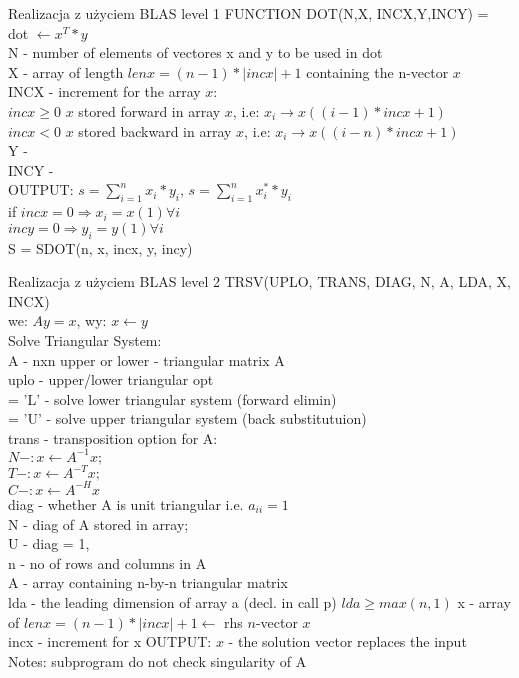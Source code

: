 	\begin{frame}{Realizacja z użyciem BLAS level 1}
		FUNCTION \textunderscore DOT(N,X, INCX,Y,INCY) = dot $ \leftarrow x^T * y $ \\ %
		N - number of elements of vectores x and y to be used in dot \\
		X - array of length $lenx = (n - 1) * |inc x| + 1$ containing the n-vector $x$ \\
		INCX - increment for the array $x$: \\
		$incx \geq 0 $ $x$ stored forward in array $x$, i.e: $x_i \rightarrow x((i - 1) * incx + 1)$ \\
		$incx < 0$ $x$ stored backward in array $x$, i.e: $x_i \rightarrow x((i - n) * incx + 1)$ \\
		Y - \\
		INCY - \\
		OUTPUT: $s = \sum_{i=1}^n x_i * y_i$, $s = \sum_{i=1}^n x_i^{*} * y_i$ \\
		if $incx = 0 \Rightarrow x_i = x(1) \forall i$ \\
		$incy = 0 \Rightarrow y_i = y(1) \forall i$ \\
		S = SDOT(n, x, incx, y, incy)
	\end{frame}
	\begin{frame}[allowframebreaks]{Realizacja z użyciem BLAS level 2}
	\textunderscore TRSV(UPLO, TRANS, DIAG, N, A, LDA, X, INCX) \\ %
	we: $ Ay = x $, wy: $x \leftarrow y$ \\ %
	Solve Triangular System: \\ 
	A - nxn upper or lower - triangular matrix A \\ %
	uplo - upper/lower triangular opt \\
	= 'L' - solve lower triangular system (forward elimin) \\
	= 'U' - solve upper triangular system (back substitutuion) \\
	trans - transposition option for A: \\
	$N - : x \leftarrow A^{-1} x;$ \\
	$T - : x \leftarrow A^{-T} x;$ \\
	$C - : x \leftarrow A^{-H} x$ \\
	diag - whether A is unit triangular i.e. $a_{ii} = 1$ \\
	N - diag of A stored in array; \\
	U - diag = 1, \\
	n - no of rows and columns in A \\
	A - array containing n-by-n triangular matrix \\
	lda - the leading dimension of array a (decl. in call p) $lda \geq max(n, 1)$
	x - array of $lenx = (n - 1) * |incx| + 1 \leftarrow$ rhs $n$-vector $x$ \\
	incx - increment for x
	OUTPUT:  $x$ - the solution vector replaces the input \\
	Notes: subprogram do not check singularity of A \\
	\end{frame}
